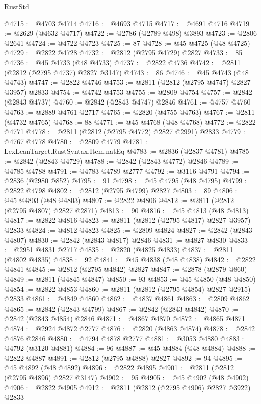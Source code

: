 \begin{lexlean}{RustStd}
\begin{coremodule}
{\begin{coremodule}
{{{{{{{{{{{{{{{{{{{{{{{{{{{{{{{{{@4715 := @4703 @4714
@4716 := @4693 @4715
@4717 := @4691 @4716
@4719 := @2629 (@4632 @4717)
@4722 := @2786 (@2789 @498) @3893
@4723 := @2806 @2641
@4724 := @4722 @4723
@4725 := 87
@4728 := @45 @4725 (@48 @4725)
@4729 := @2822 @4728
@4732 := @2812 (@2795 @4729) @2827
@4733 := 85
@4736 := @45 @4733 (@48 @4733)
@4737 := @2822 @4736
@4742 := @2811 (@2812 (@2795 @4737) @2827 @3147)
@4743 := 86
@4746 := @45 @4743 (@48 @4743)
@4747 := @2822 @4746
@4753 := @2811 (@2812 (@2795 @4747) @2827 @3957) @2833
@4754 := @4742 @4753
@4755 := @2809 @4754
@4757 := @2842 (@2843 @4737)
@4760 := @2842 (@2843 @4747) @2846
@4761 := @4757 @4760
@4763 := @2889 @4761 @2717
@4765 := @2820 (@4755 @4763)
@4767 := @2811 (@4732 @4765)
@4768 := 88
@4771 := @45 @4768 (@48 @4768)
@4772 := @2822 @4771
@4778 := @2811 (@2812 (@2795 @4772) @2827 @2991) @2833
@4779 := @4767 @4778
@4780 := @2809 @4779
@4781 := LexLeanTarget.RustSyntax.Item.natEq
@4783 := @2836 (@2837 @4781)
@4785 := @2842 (@2843 @4729)
@4788 := @2842 (@2843 @4772) @2846
@4789 := @4785 @4788
@4791 := @4783 @4789 @2777
@4792 := @3116 @4791
@4794 := @2836 (@2980 @852)
@4795 := 91
@4798 := @45 @4795 (@48 @4795)
@4799 := @2822 @4798
@4802 := @2812 (@2795 @4799) @2827
@4803 := 89
@4806 := @45 @4803 (@48 @4803)
@4807 := @2822 @4806
@4812 := @2811 (@2812 (@2795 @4807) @2827 @2871)
@4813 := 90
@4816 := @45 @4813 (@48 @4813)
@4817 := @2822 @4816
@4823 := @2811 (@2812 (@2795 @4817) @2827 @3957) @2833
@4824 := @4812 @4823
@4825 := @2809 @4824
@4827 := @2842 (@2843 @4807)
@4830 := @2842 (@2843 @4817) @2846
@4831 := @4827 @4830
@4833 := @2951 @4831 @2717
@4835 := @2820 (@4825 @4833)
@4837 := @2811 (@4802 @4835)
@4838 := 92
@4841 := @45 @4838 (@48 @4838)
@4842 := @2822 @4841
@4845 := @2812 (@2795 @4842) @2827
@4847 := @2878 (@2879 @860)
@4849 := @2811 (@4845 @4847)
@4850 := 93
@4853 := @45 @4850 (@48 @4850)
@4854 := @2822 @4853
@4860 := @2811 (@2812 (@2795 @4854) @2827 @2915) @2833
@4861 := @4849 @4860
@4862 := @4837 @4861
@4863 := @2809 @4862
@4865 := @2842 (@2843 @4799)
@4867 := @2842 (@2843 @4842)
@4870 := @2842 (@2843 @4854) @2846
@4871 := @4867 @4870
@4872 := @4865 @4871
@4874 := @2924 @4872 @2777
@4876 := @2820 (@4863 @4874)
@4878 := @2842 @4876 @2846
@4880 := @4794 @4878 @2777
@4881 := @3053 @4880
@4883 := @4792 (@3120 @4881)
@4884 := 96
@4887 := @45 @4884 (@48 @4884)
@4888 := @2822 @4887
@4891 := @2812 (@2795 @4888) @2827
@4892 := 94
@4895 := @45 @4892 (@48 @4892)
@4896 := @2822 @4895
@4901 := @2811 (@2812 (@2795 @4896) @2827 @3147)
@4902 := 95
@4905 := @45 @4902 (@48 @4902)
@4906 := @2822 @4905
@4912 := @2811 (@2812 (@2795 @4906) @2827 @3922) @2833
}}}}}}}}}}}}}}}}}}}}}}}}}}}}}}}}}
\end{coremodule}}
\end{coremodule}
\end{lexlean}
